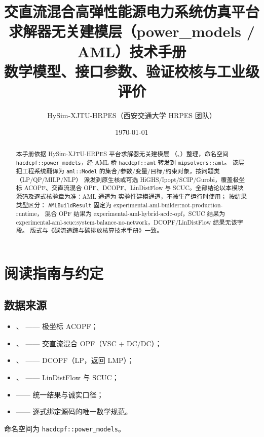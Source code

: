 \documentclass[UTF8,fontset=fandol,a4paper,11pt]{ctexart}
\title{\textbf{交直流混合高弹性能源电力系统仿真平台}\\[0.5em]
       {\Large 求解器无关建模层（power\_models / AML）技术手册}\\[0.3em]
       {\large 数学模型、接口参数、验证校核与工业级评价}}
\author{HySim-XJTU-HRPES（西安交通大学 HRPES 团队）}
\date{\today}
\begin{document}
\maketitle
\begin{abstract}
\noindent 本手册依据 HySim-XJTU-HRPES 平台求解器无关建模层
（、）整理，命名空间
\texttt{hacdcpf::power\_models}，经 AML 桥 \texttt{hacdcpf::aml} 转发到 \texttt{mipsolvers::aml}。
该层把工程系统翻译为 \texttt{aml::Model} 的集合/参数/变量/目标/约束对象，按问题类（LP/QP/MILP/NLP）
派发到原生核或可选 HiGHS/Ipopt/SCIP/Gurobi，覆盖极坐标 ACOPF、交直流混合 OPF、DCOPF、LinDistFlow
与 SCUC。全部结论以本模块源码及逐式核验章为准：AML 通道为
实验性建模通道，不被生产运行时使用； 按结果类型区分：
\texttt{AMLBuildResult} 固定为 experimental-aml-builder:not-production-runtime，
混合 OPF 结果为 experimental-aml-hybrid-acdc-opf，SCUC 结果为
experimental-aml-scuc:system-balance-no-network，DCOPF/LinDistFlow 结果无该字段。
版式与《碳流追踪与碳排放核算技术手册》一致。
\end{abstract}

\tableofcontents
\newpage

\section{阅读指南与约定}
\subsection{数据来源}
\begin{itemize}
  \item {}、
         —— 极坐标 ACOPF；
  \item {}、
         —— 交直流混合 OPF（VSC + DC/DC）；
  \item {}、
         —— DCOPF（LP，返回 LMP）；
  \item {}、
         —— LinDistFlow 与 SCUC；
  \item {} —— 统一结果与诚实口径；
  \item {} —— 逐式绑定源码的唯一数学规范。
\end{itemize}
命名空间为 \texttt{hacdcpf::power\_models}。
\end{document}
